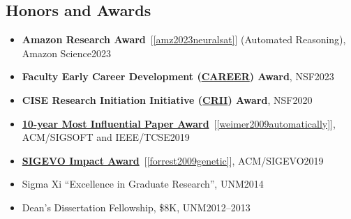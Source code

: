 \documentclass[11pt]{article}
\begin{document}
\subsection{Honors and Awards}

\begin{itemize}
  \item \textbf{Amazon Research Award}~[\ref{amz2023neuralsat}] (Automated Reasoning), Amazon Science\hfill 2023
\item \textbf{Faculty Early Career Development (\href{https://www.nsf.gov/awardsearch/showAward?AWD_ID=2238133}{CAREER}) Award}, NSF\hfill 2023

\item \textbf{CISE Research Initiation Initiative (\href{https://www.nsf.gov/awardsearch/showAward?AWD_ID=1948536}{CRII}) Award}, NSF\hfill 2020

\item \href{https://www.sigsoft.org/awards/icseMIPAward.html}{\textbf{10-year Most Influential Paper Award}}~[\ref{weimer2009automatically}], ACM/SIGSOFT and IEEE/TCSE\hfill 2019

  
\item \href{https://sig.sigevo.org/index.html/tiki-index.php?page=SIGEVO+Impact+Award}{\textbf{SIGEVO Impact Award}}~[\ref{forrest2009genetic}], ACM/SIGEVO\hfill 2019

\item  Sigma Xi ``Excellence in Graduate Research'', UNM\hfill 2014
\item Dean's Dissertation Fellowship, \$8K, UNM\hfill 2012--2013


\end{itemize}
\end{document}
